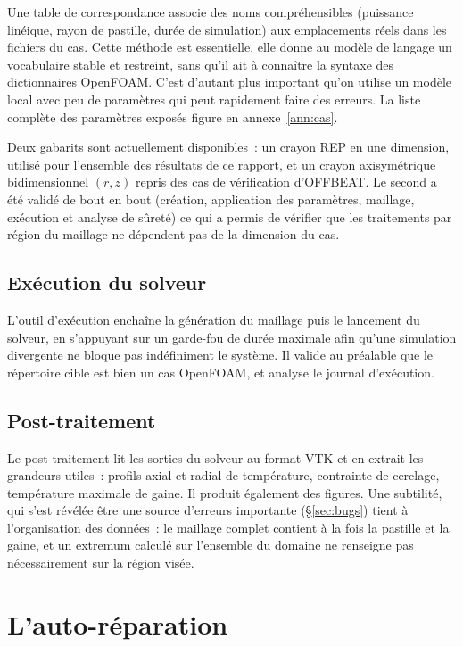 \documentclass[12pt,a4paper,french]{report}
\begin{document}
Une table de correspondance associe des noms compréhensibles (puissance
linéique, rayon de pastille, durée de simulation) aux emplacements réels dans
les fichiers du cas. Cette méthode est essentielle, elle donne au modèle de
langage un vocabulaire stable et restreint, sans qu'il ait à connaître la
syntaxe des dictionnaires OpenFOAM. C'est d'autant plus important qu'on utilise un modèle local avec peu de paramètres qui peut rapidement faire des erreurs. La liste complète des paramètres exposés
figure en annexe~\ref{ann:cas}.

Deux gabarits sont actuellement disponibles~: un crayon REP en une dimension,
utilisé pour l'ensemble des résultats de ce rapport, et un crayon
axisymétrique bidimensionnel $(r,z)$ repris des cas de vérification
d'OFFBEAT. Le second a été validé de bout en bout (création, application des
paramètres, maillage, exécution et analyse de sûreté) ce qui a permis de
vérifier que les traitements par région du maillage ne dépendent pas de la
dimension du cas.

\subsection{Exécution du solveur}

L'outil d'exécution enchaîne la génération du maillage puis le lancement du
solveur, en s'appuyant sur un garde-fou de durée maximale afin qu'une
simulation divergente ne bloque pas indéfiniment le système. Il valide au
préalable que le répertoire cible est bien un cas OpenFOAM, et analyse le
journal d'exécution.

\subsection{Post-traitement}

Le post-traitement lit les sorties du solveur au format VTK et en extrait les
grandeurs utiles~: profils axial et radial de température, contrainte de
cerclage, température maximale de gaine. Il produit également des figures.
Une subtilité, qui s'est révélée être une source d'erreurs importante
(§\ref{sec:bugs}) tient à l'organisation des données~: le maillage complet
contient à la fois la pastille et la gaine, et un extremum calculé sur
l'ensemble du domaine ne renseigne pas nécessairement sur la région visée.

\section{L'auto-réparation}
\label{sec:selfhealing}
\end{document}
